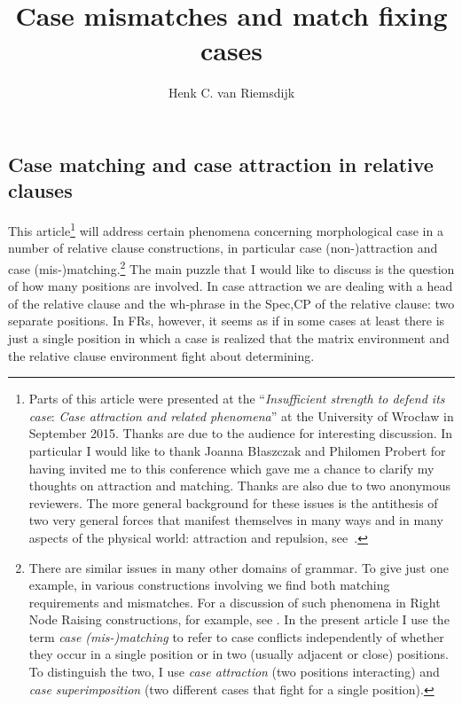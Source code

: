 \documentclass[output=paper]{langsci/langscibook}
\author{Henk C. van Riemsdijk\affiliation{Tilburg/Arezzo}}
\title{Case mismatches and match fixing cases}
\begin{document}
\glsresetall
\maketitle
\begin{refcontext}

\section{Case matching and case attraction in relative clauses}

This article\footnote{Parts of this article were presented at the
    \enquote{\emph{Insufficient strength to defend its case}: \emph{Case
    attraction and related phenomena}} at the University of Wrocław in
    September 2015. Thanks are due to the audience for interesting discussion.
    In particular I would like to thank  Joanna Błaszczak and Philomen Probert
    for having invited me to this conference which gave me a chance to clarify
    my thoughts on attraction and matching. Thanks are also due to two
    anonymous reviewers.  The more general background for these issues is the
    antithesis of two very general forces that manifest themselves in many ways
    and in many aspects of the physical world: attraction and repulsion,
    see~\textcite{VanRiemsdijk2019}.} will address certain phenomena concerning
    morphological case in a number of relative clause constructions, in
    particular case (non-)attraction and case (mis-)matching.\footnote{There
        are similar issues in many other domains of grammar. To give just one
        example, in various constructions involving  we find both
        matching requirements and mismatches. For a discussion of such
        phenomena in Right Node Raising constructions, for example, see
        \citet{Larson2012}. In the present article I use the term \emph{case
        (mis-)matching} to refer to case conflicts independently of whether
        they occur in a single position or in two (usually adjacent or close)
        positions. To distinguish the two, I use \emph{case attraction} (two
    positions interacting) and \emph{case superimposition} (two different cases
that fight for a single position).} The main puzzle that I would like to
discuss is the question of how many positions are involved. In case attraction
we are dealing with a head of the relative clause and the wh-phrase in the
Spec,CP of the relative clause: two separate positions. In \glspl{FR}, however,
it seems as if in some cases at least there is just a single position in which
a case is realized that the matrix environment and the relative clause
environment fight about determining.


\end{refcontext}
\end{document}
